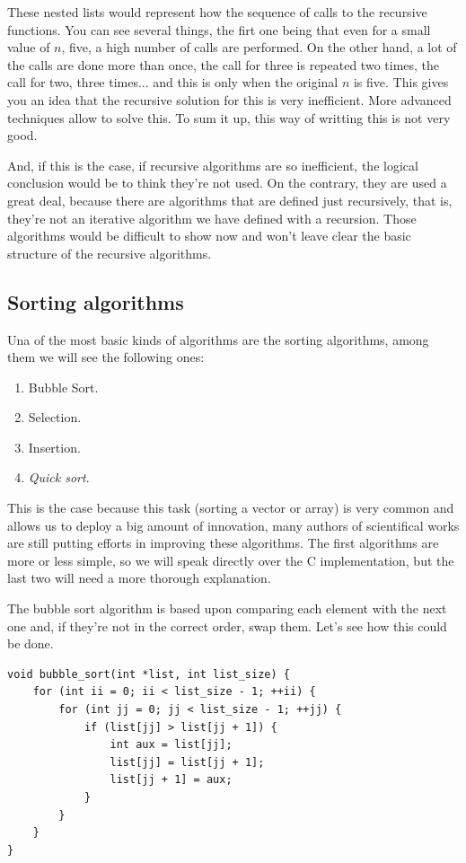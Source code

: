 \documentclass[a4paper]{article}
\begin{document}
These nested lists would represent how the sequence of calls to the recursive
functions. You can see several things, the firt one being that even for a
small value of $n$, five, a high number of calls are performed. On the other
hand, a lot of the calls are done more than once, the call for three is repeated
two times, the call for two, three times... and this is only when the original
$n$ is five. This gives you an idea that the recursive solution for this is
very inefficient. More advanced techniques allow to solve this. To sum it up,
this way of writting this is not very good.

And, if this is the case, if recursive algorithms are so inefficient, the
logical conclusion would be to think they're not used. On the contrary, they are
used a great deal, because there are algorithms that are defined just
recursively, that is, they're not an iterative algorithm we have defined with a
recursion. Those algorithms would be difficult to show now and won't leave clear
the basic structure of the recursive algorithms.

\subsection{Sorting algorithms}
Una of the most basic kinds of algorithms are the sorting algorithms, among
them we will see the following ones:
\begin{enumerate}
\item Bubble Sort.
\item Selection.
\item Insertion.
\item \textit{Quick sort}.
\end{enumerate}

This is the case because this task (sorting a vector or array) is very
common and allows us to deploy a big amount of innovation, many authors of
scientifical works are still putting efforts in improving these algorithms.
The first algorithms are more
or less simple, so we will speak directly over the C implementation, but the
last two will need a more thorough explanation.

The bubble sort algorithm is based upon comparing each element with the next one
and, if they're not in the correct order, swap them. Let's see how this could be
done.

\noindent
\begin{minipage}[H]{\linewidth}
\mbox{}
\begin{lstlisting}[style=C,
caption={Bubble sort implementation},
label={lst:bubbleSort}]
void bubble_sort(int *list, int list_size) {
    for (int ii = 0; ii < list_size - 1; ++ii) {
        for (int jj = 0; jj < list_size - 1; ++jj) {
            if (list[jj] > list[jj + 1]) {
                int aux = list[jj];
                list[jj] = list[jj + 1];
                list[jj + 1] = aux;
            }
        }
    }
}
\end{lstlisting}
\end{minipage}
\end{document}
